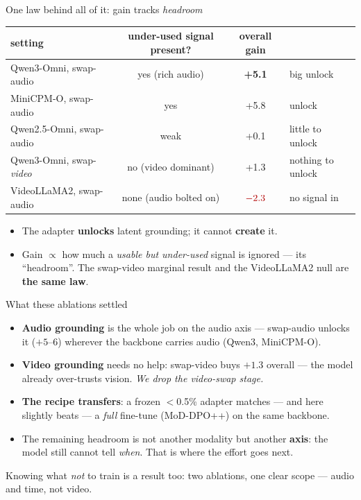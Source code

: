 \documentclass[aspectratio=169,11pt]{beamer}
\begin{document}
\begin{frame}{One law behind all of it: gain tracks \emph{headroom}}
\centering
\renewcommand{\arraystretch}{1.2}
\small
\begin{tabular}{l c c l}
\toprule
setting & under-used signal present? & overall gain & \\
\midrule
Qwen3-Omni, swap-audio        & yes (rich audio)       & \textbf{+5.1} & big unlock \\
MiniCPM-O, swap-audio         & yes                    & +5.8 & unlock \\ %
Qwen2.5-Omni, swap-audio      & weak                   & +0.1 & little to unlock \\
Qwen3-Omni, swap-\emph{video} & no (video dominant)    & +1.3 & nothing to unlock \\ %
VideoLLaMA2, swap-audio       & none (audio bolted on) & $\textcolor{red!70!black}{-2.3}$ & no signal in \\
\bottomrule
\end{tabular}
\vfill
\begin{itemize}\small
\item The adapter \textbf{unlocks} latent grounding; it cannot \textbf{create} it.
\item Gain $\propto$ how much a \emph{usable but under-used} signal is ignored --- its ``headroom''.
The swap-video marginal result and the VideoLLaMA2 null are \textbf{the same law}.
\end{itemize}
\end{frame}

\begin{frame}{What these ablations settled}
\begin{itemize}\small
\item[\textcolor{green!45!black}{$\boldsymbol{\checkmark}$}] \textbf{Audio grounding} is the whole job
on the audio axis --- swap-audio unlocks it ($+5$--$6$) wherever the backbone carries audio (Qwen3,
MiniCPM-O).
\item[\textcolor{red!70!black}{$\boldsymbol{\times}$}] \textbf{Video grounding} needs no help:
swap-video buys $+1.3$ overall --- the model already over-trusts vision. \emph{We drop the video-swap
stage.}
\item[\textcolor{green!45!black}{$\boldsymbol{\checkmark}$}] \textbf{The recipe transfers}: a frozen
$<$0.5\% adapter matches --- and here slightly beats --- a \emph{full} fine-tune (MoD-DPO++) on the
same backbone.
\item[$\rightarrow$] The remaining headroom is not another modality but another \textbf{axis}: the
model still cannot tell \emph{when}. That is where the effort goes next.
\end{itemize}
\vfill
\begin{center}
\begin{block}{}
\centering\small Knowing what \emph{not} to train is a result too: two ablations, one clear scope ---
audio and time, not video.
\end{block}
\end{center}
\end{frame}
\end{document}

